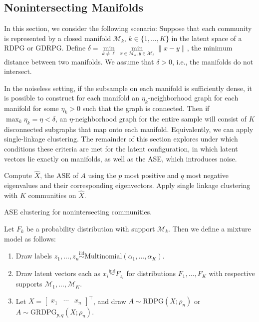 \documentclass[12pt]{article}
\providecommand{\tightlist}{%
  \setlength{\itemsep}{0pt}\setlength{\parskip}{0pt}}
\begin{document}
\hypertarget{nonintersecting-manifolds}{%
\subsection{Nonintersecting Manifolds}\label{nonintersecting-manifolds}}

\label{section:nonintersecting}

In this section, we consider the following scenario: Suppose that each
community is represented by a closed manifold \(\mathcal{M}_k\),
\(k \in \{1, ..., K\}\) in the latent space of a RDPG or GDRPG. Define
\(\delta = \min\limits_{k \neq \ell} \min\limits_{x \in \mathcal{M}_k, y \in \mathcal{M}_\ell} \|x - y\|\),
the minimum distance between two manifolds. We assume that
\(\delta > 0\), i.e., the manifolds do not intersect.

In the noiseless setting, if the subsample on each manifold is
sufficiently dense, it is possible to construct for each manifold an
\(\eta_k\)-neighborhood graph for each manifold for some \(\eta_k > 0\)
such that the graph is connected. Then if
\(\max_k \eta_k = \eta < \delta\), an \(\eta\)-neighborhood graph for
the entire sample will consist of \(K\) disconnected subgraphs that map
onto each manifold. Equivalently, we can apply single-linkage
clustering. The remainder of this section explores under which
conditions these criteria are met for the latent configuration, in which
latent vectors lie exactly on manifolds, as well as the ASE, which
introduces noise.

\begin{algorithm}[h]
\DontPrintSemicolon
\SetAlgoLined
{}
Compute $\hat{X}$, the ASE of $A$ using the $p$ most positive and $q$ most negative eigenvalues and their corresponding eigenvectors.\;
Apply single linkage clustering with $K$ communities on $\hat{X}$.\;
\caption{ASE clustering for nonintersecting communities.}
\end{algorithm}

Let \(F_k\) be a probability distribution with support
\(\mathcal{M}_k\). Then we define a mixture model as follows:

\begin{enumerate}
\def\labelenumi{\arabic{enumi}.}
\tightlist
\item
  Draw labels
  \(z_1, ..., z_n \stackrel{\mathrm{iid}}{\sim}\mathrm{Multinomial}(\alpha_1, ..., \alpha_K)\).
\item
  Draw latent vectors each as
  \(x_i \stackrel{\mathrm{ind}}{\sim}F_{z_i}\) for distributions
  \(F_1, ..., F_K\) with respective supports
  \(\mathcal{M}_1, ..., \mathcal{M}_K\).
\item
  Let \(X = \begin{bmatrix} x_1 & \cdots & x_n \end{bmatrix}^\top\), and
  draw \(A \sim \mathrm{RDPG}(X; \rho_n)\) or
  \(A \sim \mathrm{GRDPG}_{p,q}(X; \rho_n)\).
\end{enumerate}
\end{document}

